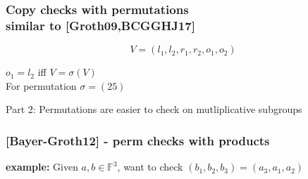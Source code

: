 \documentclass[shadesubsections,trans,14pt,mathserif]{beamer}
\newcommand{\F}{\ensuremath{\mathbb F}}
\begin{document}
\begin{frame}
\frametitle{Copy checks with permutations\\ \normalsize{similar to [Groth09,BCGGHJ17]}}   %
 
 
 \[V= (l_1,l_2,r_1,r_2,o_1,o_2)\]
 
 $o_1=l_2$ iff $V=\sigma(V)$ \\
 For permutation $\sigma = (25)$
 
 

\end{frame}





\begin{frame}
\large{Part 2: Permutations are easier to check on mutliplicative subgroups
}

\end{frame}

\begin{frame}
\frametitle{{\normalsize{[Bayer-Groth12]}} - perm checks with products}   %
\textbf{example:} Given $a,b\in \F^3$, want to check $(b_1,b_2,b_3) = (a_3,a_1,a_2)$ \\


\end{frame}
\end{document}
